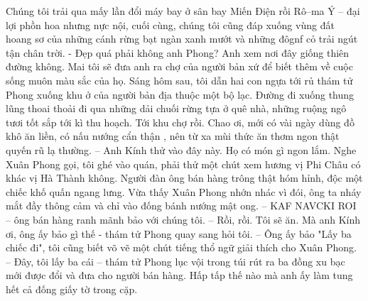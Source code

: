 	{\color{toanhocdoisong}{THỔ NGỮ CHÂU PHI} } %
	\vskip 0.1cm 
	Chúng tôi trải qua mấy lần đổi máy bay ở sân bay Miến Điện rồi Rô--ma Ý -- đại lợi phồn hoa nhưng nực nội, cuối cùng, chúng tôi cũng đáp xuống vùng đất hoang sơ của những cánh rừng bạt ngàn xanh mướt và những đôgnf cỏ trải ngút tận chân trời. %
	\vskip 0.1cm
	- Đẹp quá phải không anh Phong? Anh xem nơi đây giống thiên đường không. Mai tôi sẽ đưa anh ra chợ của người bản xứ để biết thêm về cuộc sống muôn màu sắc của họ. 
	\vskip 0.1cm
	Sáng hôm sau, tôi dẫn hai con ngựa tới rủ thám tử Phong xuống khu ở của người bản địa thuộc một bộ lạc. Đường đi xuống thung lũng thoai thoải đi qua những dải chuối rừng tựa ở quê nhà, những ruộng ngô tươi tốt sắp tới kì thu hoạch. Tới khu chợ rồi. Chao ơi, mới có vài ngày dùng đồ khô ăn liền, có nấu nướng cẩn thận , nên từ xa mùi thức ăn thơm ngon thật quyến rũ lạ thường.
	\vskip 0.1cm
	-- Anh Kính thử vào đây này. Họ có món gì ngon lắm.
		\vskip 0.1cm
Nghe Xuân Phong gọi, tôi ghé vào quán, phải thử một chút xem hương vị Phi Châu có khác vị Hà Thành không.
	\vskip 0.1cm
	Người đàn ông bán hàng trông thật hóm hỉnh, độc một chiếc khố quấn ngang lưng. Vừa thấy Xuân Phong nhớn nhác vì đói, ông ta nháy mắt đầy thông cảm và chỉ vào đống bánh nướng mật ong.
	\vskip 0.1cm
	-- KAF NAVCKI ROI -- ông bán hàng ranh mãnh bảo với chúng tôi.
	\vskip 0.1cm
	-- Rồi, rồi. Tôi sẽ ăn. Mà anh Kính ơi, ông ấy bảo gì thế - thám tử Phong quay sang hỏi tôi.
	\vskip 0.1cm
	-- Ông ấy bảo "Lấy ba chiếc đi", tôi cũng biết võ vẽ một chút tiếng thổ ngữ giải thích cho Xuân Phong.
		\vskip 0.1cm
	-- Đây, tôi lấy ba cái -- thám tử Phong lục vội trong túi rút ra ba đồng xu bạc mới được đổi và đưa cho người bán hàng. Hấp tấp thế nào mà anh ấy làm tung hết cả đống giấy tờ trong cặp. 
